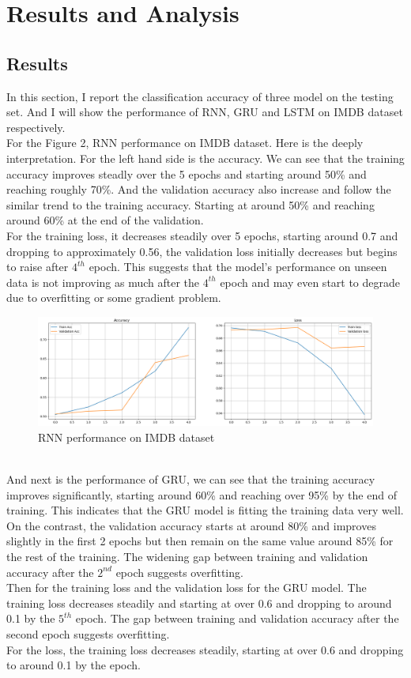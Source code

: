 \documentclass[12pt,a4paper]{article}
\begin{document}
\section{Results and Analysis}
\subsection{Results}
In this section, I report the classification accuracy of three model on the testing set. And I will show the performance of RNN, GRU and LSTM on IMDB dataset respectively. 
\\[1ex]
For the Figure 2, RNN performance on IMDB dataset. Here is the deeply interpretation. For the left hand side is the accuracy. We can see that the training accuracy improves steadly over the 5 epochs and starting around 50\% and reaching roughly 70\%. And the validation accuracy also increase and follow the similar trend to the training accuracy. Starting at around 50\% and reaching around 60\% at the end of the validation. 
\\[1ex]
For the training loss, it decreases steadily over 5 epochs, starting around 0.7 and dropping to approximately 0.56, the validation loss initially decreases but begins to raise after $4^{th}$ epoch. This suggests that the model's performance on unseen data is not improving as much after the $4^{th}$ epoch and may even start to degrade due to overfitting or some gradient problem.
\begin{figure}[h!]
    \centering
    \includegraphics[width=1\textwidth]{../Pic/rnn_performance.png} 
    \caption{RNN performance on IMDB dataset}
\end{figure}
\\[1ex]
And next is the performance of GRU, we can see that the training accuracy improves significantly, starting around 60\% and reaching over 95\% by the end of training. This indicates that the GRU model is fitting the training data very well. On the contrast, the validation accuracy starts at around 80\% and improves slightly in the first 2 epochs but then remain on the same value around 85\% for the rest of the training. The widening gap between training and validation accuracy after the $2^{nd}$ epoch suggests overfitting. 
\\[1ex]
Then for the training loss and the validation loss for the GRU model. The training loss decreases steadily and starting at over 0.6 and dropping to around 0.1 by the $5^{th}$ epoch. The gap between training and validation accuracy after the second epoch suggests overfitting.
\\[1ex]
For the loss, the training loss decreases steadily, starting at over 0.6 and dropping to around 0.1 by the epoch. 
\end{document}
